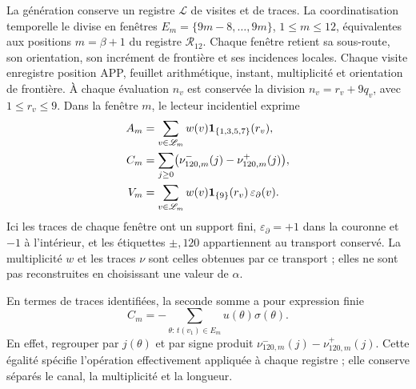 La génération conserve un registre \(\mathscr L\) de visites et de traces.
La coordinatisation temporelle le divise en fenêtres
\(E_m=\{9m-8,\ldots,9m\}\), \(1\le m\le12\),
équivalentes aux positions \(m=\beta+1\) du registre
\(\mathcal R_{12}\). Chaque fenêtre retient sa sous-route,
son orientation, son incrément de frontière et ses incidences locales.
Chaque visite enregistre position APP, feuillet arithmétique, instant, multiplicité
et orientation de frontière. À chaque évaluation \(n_v\) est conservée la
division \(n_v=r_v+9q_v\), avec \(1\le r_v\le9\). Dans la fenêtre
\(m\), le lecteur incidentiel exprime
\begin{align}
 A_m&=\sum_{v\in\mathscr L_m}w(v)
      \mathbf1_{\{1,3,5,7\}}(r_v),\notag\\
 C_m&=\sum_{j\ge0}
       \bigl(\nu^-_{120,m}(j)-\nu^+_{120,m}(j)\bigr),\notag\\
 V_m&=\sum_{v\in\mathscr L_m}w(v)
      \mathbf1_{\{9\}}(r_v)\,\varepsilon_{\partial}(v).
 \label{vi:dep:incidencias}
\end{align}
Ici les traces de chaque fenêtre ont un support fini,
\(\varepsilon_{\partial}=+1\) dans la couronne et \(-1\) à l’intérieur,
et les étiquettes \(\pm,120\) appartiennent au transport conservé.
La multiplicité \(w\) et les traces \(\nu\) sont celles obtenues par ce
transport ; elles ne sont pas reconstruites en choisissant une valeur de \(\alpha\).

En termes de traces identifiées, la seconde somme a pour
expression finie
\[
 C_m=-\sum_{\theta:\,t(v_1)\in E_m}u(\theta)\sigma(\theta).
\]
En effet, regrouper par \(j(\theta)\) et par signe produit
\(\nu^-_{120,m}(j)-\nu^+_{120,m}(j)\). Cette égalité spécifie
l’opération effectivement appliquée à chaque registre ; elle conserve
séparés le canal, la multiplicité et la longueur.

